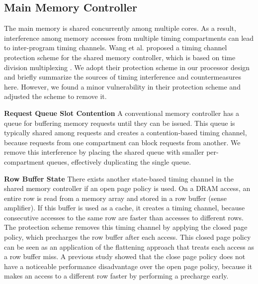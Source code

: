 \subsection{Main Memory Controller}

The main memory is shared concurrently among multiple cores. As a result,
interference among memory accesses from multiple timing compartments can lead
to inter-program timing channels. 
Wang et al. proposed a timing channel protection scheme for the shared memory
controller, which is based on time division multiplexing \cite{ushpca14}. We 
adopt their protection scheme in our processor design and briefly summarize the 
sources of timing interference and countermeasures here.
However, we found a minor vulnerability in their protection scheme and
adjusted the scheme to remove it.

\textbf{Request Queue Slot Contention}
A conventional memory controller has a queue for buffering memory requests 
until they can be issued. This queue is typically shared among requests and creates
a contention-based timing channel, because requests from one compartment can 
block requests from another. We remove this interference by placing the shared queue 
with smaller per-compartment queues, effectively duplicating the single queue.

\textbf{Row Buffer State}
There exists another state-based timing channel in the shared memory controller
if an open page policy is used. On a DRAM access, an entire row is read from
a memory array and stored in a row buffer (sense amplifier). If this buffer is
used as a cache, it creates a timing channel, because consecutive accesses to 
the same row are faster than accesses to different rows.
The protection scheme removes this timing channel by applying the closed page
policy, which precharges the row buffer after each access. This
closed page policy can be seen as an application of the flattening approach 
that treats each access as a row buffer miss. A previous study \cite{ushpca14}
showed that the close page policy does not have a noticeable performance
disadvantage over the open page policy, because it makes an access to a different
row faster by performing a precharge early.

